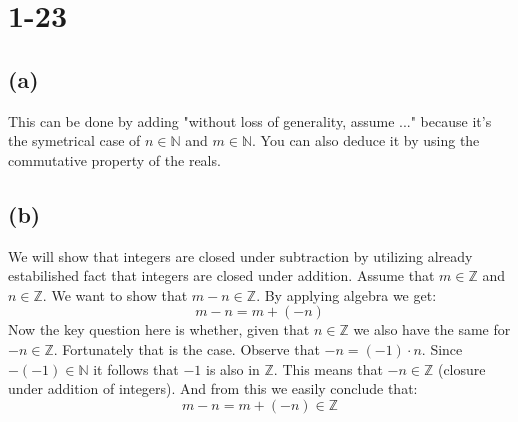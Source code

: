 \documentclass{article}
\begin{document}
\section*{1-23}
\subsection*{(a)}
This can be done by adding "without loss of generality, assume ..." because it's the symetrical case of \(n \in \mathbb{N}\)
and \(m \in \mathbb{N}\). You can also deduce it by using the commutative property of the reals.
\subsection*{(b)}
We will show that integers are closed under subtraction by utilizing already estabilished fact that integers
are closed under addition. Assume that \(m \in \mathbb{Z}\) and \(n \in \mathbb{Z}\). We want to show that
\(m - n \in \mathbb{Z}\). By applying algebra we get:
\begin{equation*}
    m - n = m + (-n)
\end{equation*}
Now the key question here is whether, given that \(n \in \mathbb{Z}\) we also have the same for \(-n \in \mathbb{Z}\).
Fortunately that is the case. Observe that \(-n = (-1) \cdot n\). Since \(-(-1) \in \mathbb{N}\) it follows that \(-1\) is also in
\(\mathbb{Z}\). This means that \(-n \in \mathbb{Z}\) (closure under addition of integers). And from this we easily conclude that:
\begin{equation*}
    m - n = m + (-n) \in \mathbb{Z}
\end{equation*}
 
\end{document}

